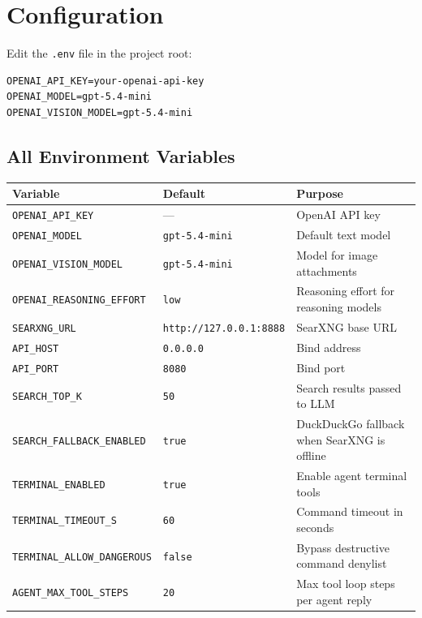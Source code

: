 \documentclass[a4paper,11pt,twoside]{report}
\begin{document}
\section{Configuration}
Edit the \texttt{.env} file in the project root:
\begin{lstlisting}
OPENAI_API_KEY=your-openai-api-key
OPENAI_MODEL=gpt-5.4-mini
OPENAI_VISION_MODEL=gpt-5.4-mini
\end{lstlisting}

\subsection{All Environment Variables}
\begin{center}\small
\begin{tabular}{@{}llp{5.5cm}@{}}
\toprule
\textbf{Variable} & \textbf{Default} & \textbf{Purpose} \\
\midrule
\texttt{OPENAI\_API\_KEY} & --- & OpenAI API key \\
\texttt{OPENAI\_MODEL} & \texttt{gpt-5.4-mini} & Default text model \\
\texttt{OPENAI\_VISION\_MODEL} & \texttt{gpt-5.4-mini} & Model for image attachments \\
\texttt{OPENAI\_REASONING\_EFFORT} & \texttt{low} & Reasoning effort for reasoning models \\
\texttt{SEARXNG\_URL} & \texttt{http://127.0.0.1:8888} & SearXNG base URL \\
\texttt{API\_HOST} & \texttt{0.0.0.0} & Bind address \\
\texttt{API\_PORT} & \texttt{8080} & Bind port \\
\texttt{SEARCH\_TOP\_K} & \texttt{50} & Search results passed to LLM \\
\texttt{SEARCH\_FALLBACK\_ENABLED} & \texttt{true} & DuckDuckGo fallback when SearXNG is offline \\
\texttt{TERMINAL\_ENABLED} & \texttt{true} & Enable agent terminal tools \\
\texttt{TERMINAL\_TIMEOUT\_S} & \texttt{60} & Command timeout in seconds \\
\texttt{TERMINAL\_ALLOW\_DANGEROUS} & \texttt{false} & Bypass destructive command denylist \\
\texttt{AGENT\_MAX\_TOOL\_STEPS} & \texttt{20} & Max tool loop steps per agent reply \\
\bottomrule
\end{tabular}
\end{center}
\end{document}
